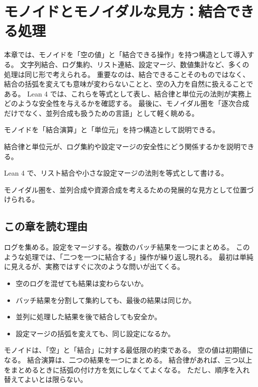 \chapter{モノイドとモノイダルな見方：結合できる処理}
\label{chap:monoids-monoidal}

\begin{chapterabstract}
本章では、モノイドを「空の値」と「結合できる操作」を持つ構造として導入する。
文字列結合、ログ集約、リスト連結、設定マージ、数値集計など、多くの処理は同じ形で考えられる。
重要なのは、結合できることそのものではなく、結合の括弧を変えても意味が変わらないことと、空の入力を自然に扱えることである。
Lean 4 では、これらを等式として表し、結合律と単位元の法則が実務上どのような安全性を与えるかを確認する。
最後に、モノイダル圏を「逐次合成だけでなく、並列合成も扱うための言語」として軽く眺める。
\end{chapterabstract}

\begin{learninggoals}
\item モノイドを「結合演算」と「単位元」を持つ構造として説明できる。
\item 結合律と単位元が、ログ集約や設定マージの安全性にどう関係するかを説明できる。
\item Lean 4 で、リスト結合や小さな設定マージの法則を等式として書ける。
\item モノイダル圏を、並列合成や資源合成を考えるための発展的な見方として位置づけられる。
\end{learninggoals}

\section{この章を読む理由}

ログを集める。設定をマージする。複数のバッチ結果を一つにまとめる。
このような処理では、「二つを一つに結合する」操作が繰り返し現れる。
最初は単純に見えるが、実務ではすぐに次のような問いが出てくる。

\begin{itemize}
\item 空のログを混ぜても結果は変わらないか。
\item バッチ結果を分割して集約しても、最後の結果は同じか。
\item 並列に処理した結果を後で結合しても安全か。
\item 設定マージの括弧を変えても、同じ設定になるか。
\end{itemize}

\begin{intuitionbox}
モノイドは、「空」と「結合」に対する最低限の約束である。
空の値は初期値になる。
結合演算は、二つの結果を一つにまとめる。
結合律があれば、三つ以上をまとめるときに括弧の付け方を気にしなくてよくなる。
ただし、順序を入れ替えてよいとは限らない。
\end{intuitionbox}

